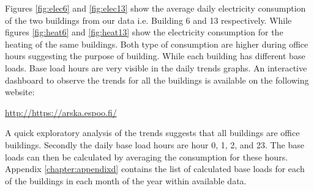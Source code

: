 Figures \ref{fig:elec6} and \ref{fig:elec13} show the average daily electricity consumption of the two buildings from our data i.e. Building 6 and 13 respectively. While  figures \ref{fig:heat6} and \ref{fig:heat13} show the electricity consumption for the heating of the same buildings. Both type of consumption are higher during office hours suggesting the purpose of building.  While each building has different base loads. Base load hours are very visible in the daily trends graphs. An interactive dashboard to observe the trends for all the buildings is available on the following website:

\url{http://https://arska.espoo.fi/}

A quick exploratory analysis of the trends suggests that all buildings are office buildings. Secondly the daily base load hours are hour 0, 1, 2, and 23. The base loads can then be calculated by averaging the consumption for these hours. Appendix \ref{chapter:appendixd} contains the list of calculated base loads for each of the buildings in each month of the year within available data.

